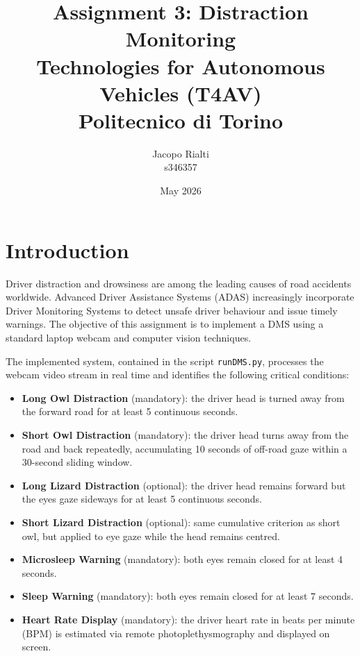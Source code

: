 \documentclass[12pt,a4paper]{article}
\title{
    \vspace{-1cm}
    \textbf{Assignment 3: Distraction Monitoring} \\[0.3cm]
    \large Technologies for Autonomous Vehicles (T4AV) \\
    Politecnico di Torino
}
\author{
    Jacopo Rialti \\ s346357
}
\date{May 2026}
\begin{document}
\maketitle
\thispagestyle{fancy}



\tableofcontents
\newpage



\section{Introduction}\label{sec:intro}

Driver distraction and drowsiness are among the leading causes of road accidents worldwide. Advanced Driver Assistance Systems (ADAS) increasingly incorporate Driver Monitoring Systems to detect unsafe driver behaviour and issue timely warnings. The objective of this assignment is to implement a DMS using a standard laptop webcam and computer vision techniques.

The implemented system, contained in the script \texttt{runDMS.py}, processes the webcam video stream in real time and identifies the following critical conditions:

\begin{itemize}[noitemsep]
    \item \textbf{Long Owl Distraction} (mandatory): the driver head is turned away from the forward road for at least 5 continuous seconds.
    \item \textbf{Short Owl Distraction} (mandatory): the driver head turns away from the road and back repeatedly, accumulating 10 seconds of off-road gaze within a 30-second sliding window.
    \item \textbf{Long Lizard Distraction} (optional): the driver head remains forward but the eyes gaze sideways for at least 5 continuous seconds.
    \item \textbf{Short Lizard Distraction} (optional): same cumulative criterion as short owl, but applied to eye gaze while the head remains centred.
    \item \textbf{Microsleep Warning} (mandatory): both eyes remain closed for at least 4 seconds.
    \item \textbf{Sleep Warning} (mandatory): both eyes remain closed for at least 7 seconds.
    \item \textbf{Heart Rate Display} (mandatory): the driver heart rate in beats per minute (BPM) is estimated via remote photoplethysmography and displayed on screen.
\end{itemize}
\end{document}

